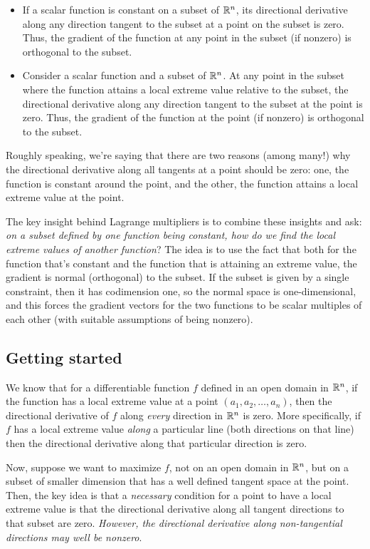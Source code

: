 \documentclass[10pt]{amsart}
\begin{document}
\begin{itemize}
\item If a scalar function is constant on a subset of $\mathbb{R}^n$, its
  directional derivative along any direction tangent to the subset at
  a point on the subset is zero. Thus, the gradient of the function at
  any point in the subset (if nonzero) is orthogonal to the subset.
\item Consider a scalar function and a subset of $\mathbb{R}^n$. At any point
  in the subset where the function attains a local extreme value
  relative to the subset, the directional derivative along any
  direction tangent to the subset at the point is zero. Thus, the
  gradient of the function at the point (if nonzero) is orthogonal to
  the subset.
\end{itemize}

Roughly speaking, we're saying that there are two reasons (among
many!) why the directional derivative along all tangents at a point
should be zero: one, the function is constant around the point, and
the other, the function attains a local extreme value at the point.

The key insight behind Lagrange multipliers is to combine these
insights and ask: {\em on a subset defined by one function being
constant, how do we find the local extreme values of another
function}? The idea is to use the fact that both for the function
that's constant and the function that is attaining an extreme value,
the gradient is normal (orthogonal) to the subset. If the subset is
given by a single constraint, then it has codimension one, so the
normal space is one-dimensional, and this forces the gradient vectors
for the two functions to be scalar multiples of each other (with
suitable assumptions of being nonzero).

\subsection{Getting started}

We know that for a differentiable function $f$ defined in an open
domain in $\mathbb{R}^n$, if the function has a local extreme value at a point
$(a_1,a_2,\dots,a_n)$, then the directional derivative of $f$ along
{\em every} direction in $\mathbb{R}^n$ is zero. More specifically, if $f$ has
a local extreme value {\em along} a particular line (both directions
on that line) then the directional derivative along that particular
direction is zero.

Now, suppose we want to maximize $f$, not on an open domain in $\mathbb{R}^n$,
but on a subset of smaller dimension that has a well defined tangent
space at the point. Then, the key idea is that a {\em necessary}
condition for a point to have a local extreme value is that the
directional derivative along all tangent directions to that subset are
zero. {\em However, the directional derivative along non-tangential
directions may well be nonzero}. 
\end{document}
